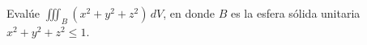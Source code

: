 \item Evalúe $\iiint_B (x^2 + y^2 + z^2) \, dV$, en donde $B$ es la esfera sólida unitaria $x^2 + y^2 + z^2 \le 1$.
